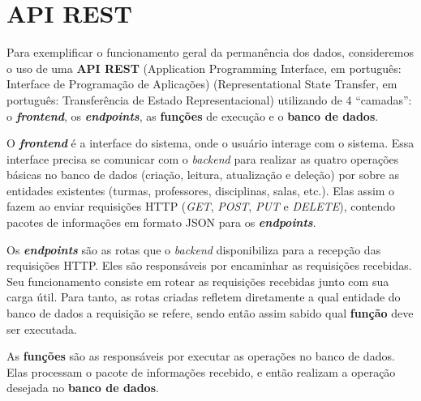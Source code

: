 
\section{API REST} \label{sec:REST} %

Para exemplificar o funcionamento geral da permanência dos dados, consideremos o uso de uma \textbf{API REST} (Application Programming Interface, em português: Interface de Programação de Aplicações) (Representational State Transfer, em português:  Transferência de Estado Representacional) utilizando de 4 ``camadas'': o \textbf{\textit{frontend}}, os \textbf{\textit{endpoints}}, as \textbf{funções} de execução e o \textbf{banco de dados}.


O \textbf{\textit{frontend}} é a interface do sistema, onde o usuário interage com o sistema. Essa interface precisa se comunicar com o \textit{backend} para realizar as quatro operações básicas no banco de dados (criação, leitura, atualização e deleção) por sobre as entidades existentes (turmas, professores, disciplinas, salas, etc.). Elas assim o fazem ao enviar requisições HTTP (\textit{GET}, \textit{POST}, \textit{PUT} e \textit{DELETE}), contendo pacotes de informações em formato JSON para os \textbf{\textit{endpoints}}.

Os \textbf{\textit{endpoints}} são as rotas que o \textit{backend} disponibiliza para a recepção das requisições HTTP. Eles são responsáveis por encaminhar as requisições recebidas. Seu funcionamento consiste em rotear as requisições recebidas junto com sua carga útil. Para tanto, as rotas criadas refletem diretamente a qual entidade do banco de dados a requisição se refere, sendo então assim sabido qual \textbf{função} deve ser executada.

As \textbf{funções} são as responsáveis por executar as operações no banco de dados. Elas processam o pacote de informações recebido, e então realizam a operação desejada no \textbf{banco de dados}.

